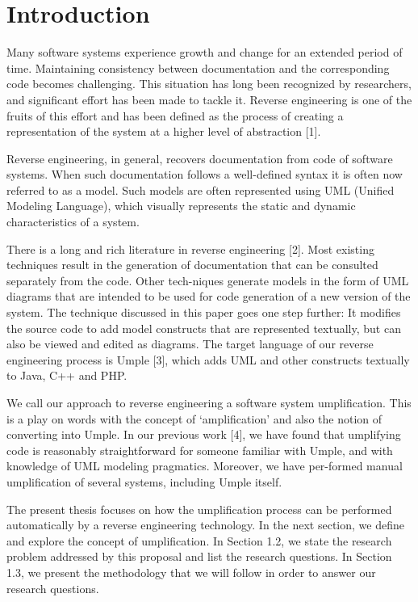 \chapter{Introduction}

Many software systems experience growth and change for an extended period of time. Maintaining consistency between documentation and the corresponding code becomes challenging. This situation has long been recognized by researchers, and significant effort has been made to tackle it. Reverse engineering is one of the fruits of this effort and has been defined as the process of creating a representation of the system at a higher level of abstraction [1].

Reverse engineering, in general, recovers documentation from code of software systems. When such documentation follows a well-defined syntax it is often now referred to as a model.  Such models are often represented using UML (Unified Modeling Language), which visually represents the static and dynamic characteristics of a system. 

There is a long and rich literature in reverse engineering [2]. Most existing techniques result in the generation of documentation that can be consulted separately from the code. Other tech-niques generate models in the form of UML diagrams that are intended to be used for code generation of a new version of the system. The technique discussed in this paper goes one step further: It modifies the source code to add model constructs that are represented textually, but can also be viewed and edited as diagrams. The target language of our reverse engineering process is Umple [3], which adds UML and other constructs textually to Java, C++ and PHP.

We call our approach to reverse engineering a software system umplification. This is a play on words with the concept of ‘amplification’ and also the notion of converting into Umple. In our previous work [4], we have found that umplifying code is reasonably straightforward for someone familiar with Umple, and with knowledge of UML modeling pragmatics. Moreover, we have per-formed manual umplification of several systems, including Umple itself. 

The present thesis focuses on how the umplification process can be performed automatically by a reverse engineering technology. In the next section, we define and explore the concept of umplification. In Section 1.2, we state the research problem addressed by this proposal and list the research questions. In Section 1.3, we present the methodology that we will follow in order to answer our research questions.

